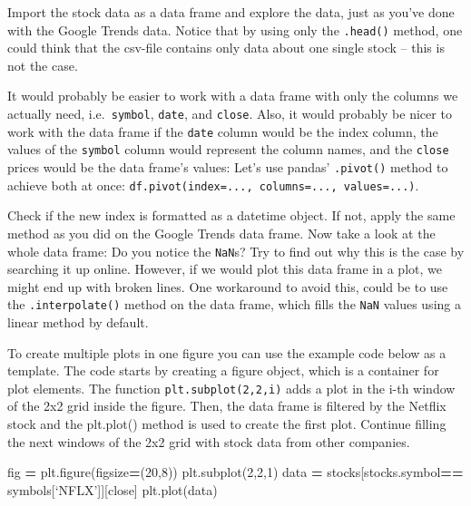 \documentclass[
  11pt,
]{article}
\newenvironment{Shaded}{\begin{snugshade}}{\end{snugshade}}
\newcommand{\DecValTok}[1]{\textcolor[rgb]{0.00,0.00,0.81}{#1}}
\newcommand{\NormalTok}[1]{#1}
\newcommand{\OperatorTok}[1]{\textcolor[rgb]{0.81,0.36,0.00}{\textbf{#1}}}
\newcommand{\StringTok}[1]{\textcolor[rgb]{0.31,0.60,0.02}{#1}}
\newenvironment{tipsp}[1]
  {
  \begin{itemize}
  \footnotesize
  \renewcommand{\labelitemi}{
    \raisebox{-.7\height}[0pt][0pt]{
      {\setkeys{Gin}{width=3em,keepaspectratio}
        \texttt{[image: images/\#1.png]}}
    }
  }
  \setlength{\fboxsep}{1em}
  \begin{pbox}
  \item
  }
  {
  \end{pbox}
  \end{itemize}
  }
\begin{document}
\begin{tipsp}p

Import the stock data as a data frame and explore the data, just as you've done with the Google Trends data. Notice that by using only the \texttt{.head()} method, one could think that the csv-file contains only data about one single stock -- this is not the case.

It would probably be easier to work with a data frame with only the columns we actually need, i.e.~\texttt{symbol}, \texttt{date}, and \texttt{close}. Also, it would probably be nicer to work with the data frame if the \texttt{date} column would be the index column, the values of the \texttt{symbol} column would represent the column names, and the \texttt{close} prices would be the data frame's values: Let's use pandas' \texttt{.pivot()} method to achieve both at once: \texttt{df.pivot(index=...,\ columns=...,\ values=...)}.

Check if the new index is formatted as a datetime object. If not, apply the same method as you did on the Google Trends data frame.
Now take a look at the whole data frame: Do you notice the \texttt{NaN}s? Try to find out why this is the case by searching it up online. However, if we would plot this data frame in a plot, we might end up with broken lines. One workaround to avoid this, could be to use the \texttt{.interpolate()} method on the data frame, which fills the \texttt{NaN} values using a linear method by default.

To create multiple plots in one figure you can use the example code below as a template. The code starts by creating a figure object, which is a container for plot elements. The function \texttt{plt.subplot(2,2,i)} adds a plot in the i-th window of the 2x2 grid inside the figure. Then, the data frame is filtered by the Netflix stock and the plt.plot() method is used to create the first plot.
Continue filling the next windows of the 2x2 grid with stock data from other companies.

\begin{Shaded}
\begin{Highlighting}[]
\NormalTok{fig }\OperatorTok{=}\NormalTok{ plt.figure(figsize}\OperatorTok{=}\NormalTok{(}\DecValTok{20}\NormalTok{,}\DecValTok{8}\NormalTok{))}
\NormalTok{plt.subplot(}\DecValTok{2}\NormalTok{,}\DecValTok{2}\NormalTok{,}\DecValTok{1}\NormalTok{)}
\NormalTok{data }\OperatorTok{=}\NormalTok{ stocks[stocks.symbol}\OperatorTok{==}\NormalTok{ symbols[‘NFLX’]][}\StringTok{\textquotesingle{}close\textquotesingle{}}\NormalTok{]}
\NormalTok{plt.plot(data)}
\end{Highlighting}
\end{Shaded}


\end{tipsp}
\end{document}
